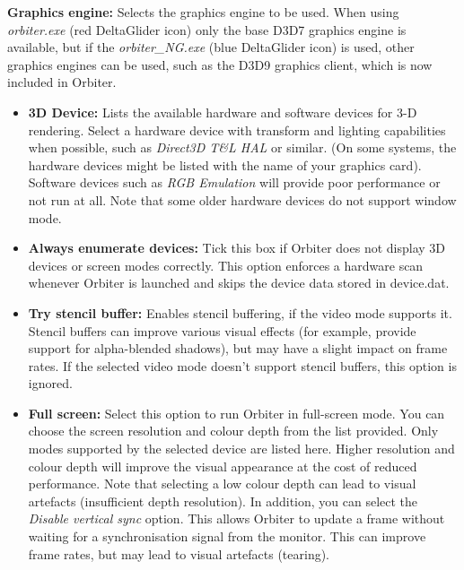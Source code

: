 \documentclass[Orbiter User Manual.tex]{subfiles}
\begin{document}
\begin{figure}[H]
	\centering
\end{figure}

\noindent
\textbf{Graphics engine:}
Selects the graphics engine to be used. When using \textit{orbiter.exe} (red DeltaGlider icon) only the base D3D7 graphics engine is available, but if the \textit{orbiter\_NG.exe} (blue DeltaGlider icon) is used, other graphics engines can be used, such as the D3D9 graphics client, which is now included in Orbiter.

\begin{itemize}
\item \textbf{3D Device:} Lists the available hardware and software devices for 3-D rendering. Select a hardware device with transform and lighting capabilities when possible, such as \textit{Direct3D T\&L HAL} or similar. (On some systems, the hardware devices might be listed with the name of your graphics card). Software devices such as \textit{RGB Emulation} will provide poor performance or not run at all. Note that some older hardware devices do not support window mode.
\item \textbf{Always enumerate devices:} Tick this box if Orbiter does not display 3D devices or screen modes correctly. This option enforces a hardware scan whenever Orbiter is launched and skips the device data stored in device.dat.
\item \textbf{Try stencil buffer:} Enables stencil buffering, if the video mode supports it. Stencil buffers can improve various visual effects (for example, provide support for alpha-blended shadows), but may have a slight impact on frame rates. If the selected video mode doesn't support stencil buffers, this option is ignored.
\item \textbf{Full screen:} Select this option to run Orbiter in full-screen mode. You can choose the screen resolution and colour depth from the list provided. Only modes supported by the selected device are listed here. Higher resolution and colour depth will improve the visual appearance at the cost of reduced performance. Note that selecting a low colour depth can lead to visual artefacts (insufficient depth resolution).\newline
In addition, you can select the \textit{Disable vertical sync} option. This allows Orbiter to update a frame without waiting for a synchronisation signal from the monitor. This can improve frame rates, but may lead to visual artefacts (tearing).\newline

\end{itemize}
\end{document}
